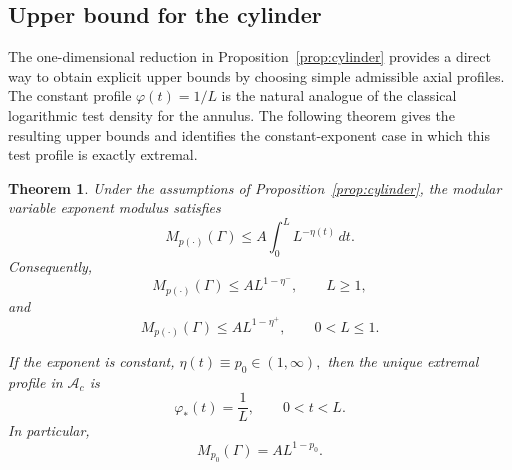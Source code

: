 \documentclass[12pt]{amsart}
\numberwithin{equation}{section}
\theoremstyle{plain}
\newtheorem{theorem}[equation]{Theorem}
\theoremstyle{definition}
\begin{document}
\subsection{Upper bound for the cylinder}

The one-dimensional reduction in Proposition~\ref{prop:cylinder}
provides a direct way to obtain explicit upper bounds by choosing
simple admissible axial profiles. The constant profile
$\varphi(t)=1/L$ is the natural analogue of the classical logarithmic
test density for the annulus. The following theorem gives the resulting
upper bounds and identifies the constant-exponent case in which this
test profile is exactly extremal.

\begin{theorem}
\label{thm:cylinder_bounds}
Under the assumptions of Proposition~\ref{prop:cylinder}, the modular
variable exponent modulus satisfies
\begin{equation}
\label{eq:cylinder_constant_upper_bound}
M_{p(\cdot)}(\Gamma)
\le
A\int_0^L L^{-\eta(t)}\,dt.
\end{equation}
Consequently,
\begin{equation}
\label{eq:cylinder_upper_bound_large_L}
M_{p(\cdot)}(\Gamma)
\le
A L^{1-\eta^-},
\qquad L\ge1,
\end{equation}
and
\begin{equation}
\label{eq:cylinder_upper_bound_small_L}
M_{p(\cdot)}(\Gamma)
\le
A L^{1-\eta^+},
\qquad 0<L\le1.
\end{equation}

If the exponent is constant,
$\eta(t)\equiv p_0\in(1,\infty),$
then the unique extremal profile in $\mathcal A_c$ is
\begin{equation}
\label{eq:cylinder_constant_extremal}
\varphi_*(t)=\frac1L,
\qquad 0<t<L.
\end{equation}
In particular,
\begin{equation}
\label{eq:cylinder_constant_modulus}
M_{p_0}(\Gamma)
=
A L^{1-p_0}.
\end{equation}
\end{theorem}
\end{document}
